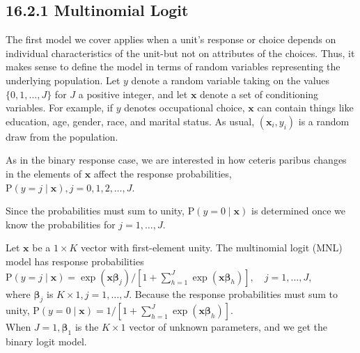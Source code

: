 \documentclass[10pt]{article}
\begin{document}
\subsection*{16.2.1 Multinomial Logit}
The first model we cover applies when a unit's response or choice depends on individual characteristics of the unit-but not on attributes of the choices. Thus, it makes sense to define the model in terms of random variables representing the underlying population. Let $y$ denote a random variable taking on the values $\{0,1, \ldots, J\}$ for $J$ a positive integer, and let $\mathbf{x}$ denote a set of conditioning variables. For example, if $y$ denotes occupational choice, $\mathbf{x}$ can contain things like education, age, gender, race, and marital status. As usual, $\left(\mathbf{x}_{i}, y_{i}\right)$ is a random draw from the population.

As in the binary response case, we are interested in how ceteris paribus changes in the elements of $\mathbf{x}$ affect the response probabilities, $\mathrm{P}(y=j \mid \mathbf{x}), j=0,1,2, \ldots, J$.

Since the probabilities must sum to unity, $\mathrm{P}(y=0 \mid \mathbf{x})$ is determined once we know the probabilities for $j=1, \ldots, J$.

Let $\mathbf{x}$ be a $1 \times K$ vector with first-element unity. The multinomial logit (MNL) model has response probabilities\\
$\mathrm{P}(y=j \mid \mathbf{x})=\exp \left(\mathbf{x} \boldsymbol{\beta}_{j}\right) /\left[1+\sum_{h=1}^{J} \exp \left(\mathbf{x} \boldsymbol{\beta}_{h}\right)\right], \quad j=1, \ldots, J$,\\
where $\boldsymbol{\beta}_{j}$ is $K \times 1, j=1, \ldots, J$. Because the response probabilities must sum to unity, $\mathrm{P}(y=0 \mid \mathbf{x})=1 /\left[1+\sum_{h=1}^{J} \exp \left(\mathbf{x} \boldsymbol{\beta}_{h}\right)\right]$.\\
When $J=1, \boldsymbol{\beta}_{1}$ is the $K \times 1$ vector of unknown parameters, and we get the binary logit model.
\end{document}

